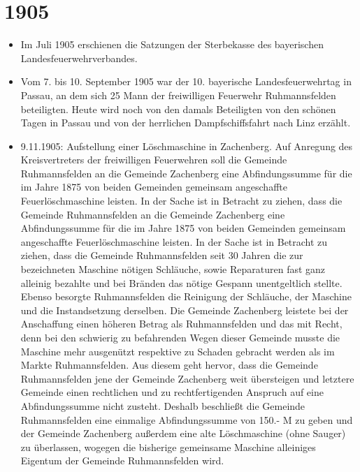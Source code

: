 \documentclass[12pt,a4paper]{book}
\begin{document}
\section*{1905}

\begin{itemize}
\item Im Juli 1905 erschienen die Satzungen der Sterbekasse des
bayerischen Landesfeuerwehrverbandes.

\item Vom 7. bis 10. September 1905 war der 10. bayerische
Landesfeuerwehrtag in Passau, an dem sich 25 Mann der freiwilligen
Feuerwehr Ruhmannsfelden beteiligten. Heute wird noch von den damals
Beteiligten von den schönen Tagen in Passau und von der herrlichen
Dampfschiffsfahrt nach Linz erzählt.

\item 9.11.1905: Aufstellung einer Löschmaschine in Zachenberg. Auf
Anregung des Kreisvertreters der freiwilligen Feuerwehren soll die
Gemeinde Ruhmannsfelden an die Gemeinde Zachenberg eine Abfindungssumme
für die im Jahre 1875 von beiden Gemeinden gemeinsam angeschaffte
Feuerlöschmaschine leisten. In der Sache ist in Betracht zu ziehen, dass
die Gemeinde Ruhmannsfelden an die Gemeinde Zachenberg eine
Abfindungssumme für die im Jahre 1875 von beiden Gemeinden gemeinsam
angeschaffte Feuerlöschmaschine leisten. In der Sache ist in Betracht zu
ziehen, dass die Gemeinde Ruhmannsfelden seit 30 Jahren die zur
bezeichneten Maschine nötigen Schläuche, sowie Reparaturen fast ganz
alleinig bezahlte und bei Bränden das nötige Gespann unentgeltlich
stellte. Ebenso besorgte Ruhmannsfelden die Reinigung der Schläuche, der
Maschine und die Instandsetzung derselben. Die Gemeinde Zachenberg
leistete bei der Anschaffung einen höheren Betrag als Ruhmannsfelden und
das mit Recht, denn bei den schwierig zu befahrenden Wegen dieser
Gemeinde musste die Maschine mehr ausgenützt respektive zu Schaden
gebracht werden als im Markte Ruhmannsfelden. Aus diesem geht hervor,
dass die Gemeinde Ruhmannsfelden jene der Gemeinde Zachenberg weit
übersteigen und letztere Gemeinde einen rechtlichen und zu
rechtfertigenden Anspruch auf eine Abfindungssumme nicht zusteht.
Deshalb beschließt die Gemeinde Ruhmannsfelden eine einmalige
Abfindungssumme von 150.- M zu geben und der Gemeinde Zachenberg
außerdem eine alte Löschmaschine (ohne Sauger) zu überlassen, wogegen
die bisherige gemeinsame Maschine alleiniges Eigentum der Gemeinde
Ruhmannsfelden wird.
\end{itemize}
\end{document}
